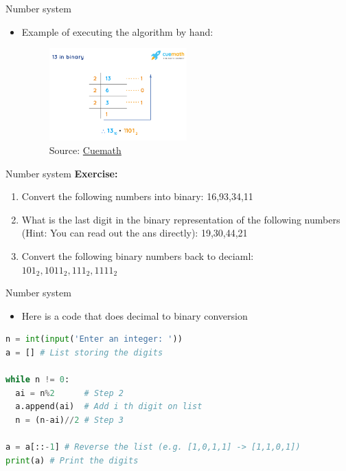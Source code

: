 \documentclass[10pt,xcolor={table,dvipsnames},t]{beamer}
\begin{document}
\begin{frame}{Number system}
  \begin{itemize}
    \item Example of executing the algorithm by hand:
    \begin{figure}
      \includegraphics[width=0.5\textwidth]{img/binary-decimal-short-div.png}
      \caption*{Source: \href{https://www.cuemath.com/numbers/13-in-binary/}{Cuemath}}
    \end{figure}
  \end{itemize}
\end{frame}

\begin{frame}{Number system}
  \textbf{Exercise:}
  \begin{enumerate}
    \item Convert the following numbers into binary: 16,93,34,11
    \item What is the last digit in the binary representation of the following numbers (Hint: You can read out the ans directly): 19,30,44,21
    \item Convert the following binary numbers back to deciaml: $101_2, 1011_2,111_2,1111_2$
  \end{enumerate}
\end{frame}

\begin{frame}[fragile]{Number system}
  \begin{itemize}
    \item Here is a code that does decimal to binary conversion
  \end{itemize}
\begin{lstlisting}[language=python]
n = int(input('Enter an integer: '))
a = [] # List storing the digits

while n != 0:
  ai = n%2      # Step 2
  a.append(ai)  # Add i th digit on list
  n = (n-ai)//2 # Step 3

a = a[::-1] # Reverse the list (e.g. [1,0,1,1] -> [1,1,0,1])
print(a) # Print the digits
\end{lstlisting}
\end{frame}
\end{document}
